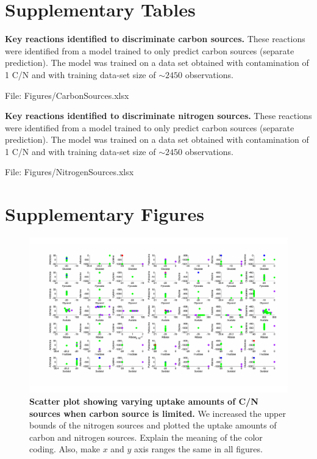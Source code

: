 \documentclass[12pt]{article}
\begin{document}
\clearpage
\section*{Supplementary Tables}
\begin{table}[!ht]
\caption{\label{tab:predictive_carbon_sources}
\textbf{Key reactions identified to discriminate carbon sources.} These reactions were identified from a model trained to only predict carbon sources (separate prediction). The model was trained on a data set obtained with contamination of 1 C/N and with training data-set size of $\sim2450$ observations.}
\bigskip

\noindent File: Figures/CarbonSources.xlsx
\end{table}

\begin{table}[!ht]
\caption{\label{tab:predictive_nitrogen_sources}
\textbf{Key reactions identified to discriminate nitrogen sources.} These reactions were identified from a model trained to only predict carbon sources (separate prediction). The model was trained on a data set obtained with contamination of 1 C/N and with training data-set size of $\sim2450$ observations.}
\bigskip

\noindent File: Figures/NitrogenSources.xlsx
\end{table}


\clearpage
\section*{Supplementary Figures}
\begin{figure}[!ht]
\centerline{\includegraphics[width=8in]{Figures/CarbonLimiting.pdf}}
\caption{\label{fig:CarbonLimiting}\textbf{Scatter plot showing varying uptake amounts of C/N sources when carbon source is limited.} We  increased the upper bounds of the nitrogen sources and plotted the uptake amounts of carbon and nitrogen sources. {\color{red}Explain the meaning of the color coding. Also, make $x$ and $y$ axis ranges the same in all figures.}}
\end{figure}
\end{document}
